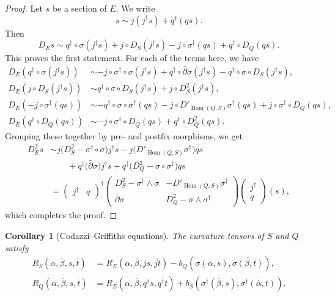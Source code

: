 \documentclass[10pt,a4paper]{amsart}
\newtheorem{coro}[theo]{Corollary}
\theoremstyle{definition}
\def\ov#1{\overline{#1}}
\DeclareMathOperator{\Hom}{Hom}
\def\snd{\sigma}
\begin{document}
\begin{proof}
Let $s$ be a section of $E$. We write
\[
s \sim j (j^\dagger s) + q^\dagger( qs).
\]
Then
\[
D_E s
\sim q^\dagger \circ \snd (j^\dagger s)
+ j \circ D_S( j^\dagger s)
- j \circ \snd^\dagger (qs)
+ q^\dagger \circ D_Q (qs).
\]
This proves the first statement.
For each of the terms here, we have
\begin{align*}
D_E(q^\dagger \circ \snd (j^\dagger s))
&\sim -j \circ \snd^\dagger \circ \snd (j^\dagger s)
+ q^\dagger \circ \bar\partial \snd (j^\dagger s)
- q^\dagger \circ \snd \circ D_S(j^\dagger s),
\\
D_E(j \circ D_S( j^\dagger s))
&\sim q^\dagger \circ \snd \circ D_S(j^\dagger s)
+ j \circ D_S^2 (j^\dagger s),
\\
D_E(-j \circ \snd^\dagger (qs))
&\sim - q^\dagger \circ \snd \circ \snd^\dagger (qs)
- j \circ D'_{\Hom(Q,S)}\snd^\dagger (qs)
+ j \circ \snd^\dagger \circ D_Q(qs),
\\
D_E(q^\dagger \circ D_Q (qs))
&\sim -j \circ \snd^\dagger \circ D_Q(qs)
+ q^\dagger \circ D_Q^2 (qs).
\end{align*}
Grouping these together by pre- and postfix morphisms, we get
\begin{align*}
D_E^2 s
&\sim j \bigl( D_S^2 - \snd^\dagger \circ \snd \bigr) j^\dagger s
- j \bigl( D'_{\Hom(Q,S)} \snd^\dagger \bigr) qs
\\
&\qquad
+ q^\dagger \bigl( \bar\partial \snd \bigr) j^\dagger s
+ q^\dagger \bigl( D^2_Q - \snd \circ \snd^\dagger \bigr) qs
\\
&=
\begin{pmatrix}
j^\dagger & q
\end{pmatrix}^\dagger
\begin{pmatrix}
D^2_S - \snd^\dagger \wedge \snd & -D'_{\Hom(Q,S)} \snd^\dagger
\\
\bar\partial \snd & D^2_Q - \snd \wedge \snd^\dagger
\end{pmatrix}
\begin{pmatrix}
  j^\dagger \\ q
\end{pmatrix}(s),
\end{align*}
which completes the proof.
\end{proof}




\begin{coro}[Codazzi--Griffiths equations]
The curvature tensors of $S$ and $Q$ satisfy
\begin{align*}
R_S(\alpha, \ov\beta, s, \ov t)
&= R_E(\alpha, \ov\beta, js, \ov{jt})
- b_Q(\snd(\alpha, s), \ov{\snd(\beta, t)}),
\\
R_Q(\alpha, \ov\beta, s, \ov t)
&= R_E(\alpha, \ov\beta, q^\dagger s, \ov{q^\dagger t})
+ b_S(\snd^\dagger(\ov\beta, s), \ov{\snd^\dagger(\ov\alpha, t)}).
\end{align*}
\end{coro}
\end{document}
